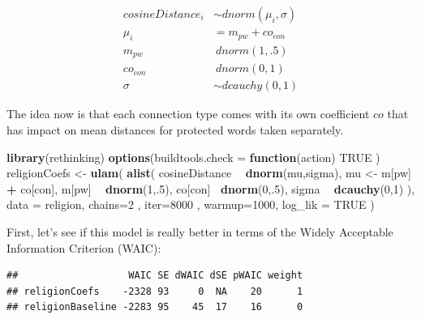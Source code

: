 \documentclass[12pt,]{book}
\newenvironment{Shaded}{\begin{snugshade}}{\end{snugshade}}
\newcommand{\KeywordTok}[1]{\textcolor[rgb]{0.13,0.29,0.53}{\textbf{#1}}}
\newcommand{\DataTypeTok}[1]{\textcolor[rgb]{0.13,0.29,0.53}{#1}}
\newcommand{\DecValTok}[1]{\textcolor[rgb]{0.00,0.00,0.81}{#1}}
\newcommand{\StringTok}[1]{\textcolor[rgb]{0.31,0.60,0.02}{#1}}
\newcommand{\OtherTok}[1]{\textcolor[rgb]{0.56,0.35,0.01}{#1}}
\newcommand{\ControlFlowTok}[1]{\textcolor[rgb]{0.13,0.29,0.53}{\textbf{#1}}}
\newcommand{\OperatorTok}[1]{\textcolor[rgb]{0.81,0.36,0.00}{\textbf{#1}}}
\newcommand{\NormalTok}[1]{#1}
\begin{document}
\begin{align}
cosineDistance_i  & \sim dnorm(\mu_i, \sigma) \\
\mu_i & = m_{pw} + co_{con}\\
m_{pw} & ~ dnorm(1,.5) \\
co_{con} & ~ dnorm(0,1) \\
\sigma &\sim  dcauchy(0,1)
\end{align}

\noindent The idea now is that each connection type comes with its own
coefficient \(co\) that has impact on mean distances for protected words
taken separately.

\vspace{1mm} \footnotesize

\begin{Shaded}
\begin{Highlighting}[]
\KeywordTok{library}\NormalTok{(rethinking)}
\KeywordTok{options}\NormalTok{(}\DataTypeTok{buildtools.check =} \ControlFlowTok{function}\NormalTok{(action) }\OtherTok{TRUE}\NormalTok{ )}
\NormalTok{religionCoefs <-}\StringTok{ }\KeywordTok{ulam}\NormalTok{(}
  \KeywordTok{alist}\NormalTok{(}
\NormalTok{    cosineDistance }\OperatorTok{~}\StringTok{ }\KeywordTok{dnorm}\NormalTok{(mu,sigma),}
\NormalTok{    mu <-}\StringTok{ }\NormalTok{m[pw] }\OperatorTok{+}\StringTok{ }\NormalTok{co[con],}
\NormalTok{    m[pw] }\OperatorTok{~}\StringTok{ }\KeywordTok{dnorm}\NormalTok{(}\DecValTok{1}\NormalTok{,.}\DecValTok{5}\NormalTok{),}
\NormalTok{    co[con] }\OperatorTok{~}\KeywordTok{dnorm}\NormalTok{(}\DecValTok{0}\NormalTok{,.}\DecValTok{5}\NormalTok{),}
\NormalTok{    sigma }\OperatorTok{~}\StringTok{ }\KeywordTok{dcauchy}\NormalTok{(}\DecValTok{0}\NormalTok{,}\DecValTok{1}\NormalTok{)}
\NormalTok{  ),}
  \DataTypeTok{data =}\NormalTok{ religion,}
  \DataTypeTok{chains=}\DecValTok{2}\NormalTok{ , }\DataTypeTok{iter=}\DecValTok{8000}\NormalTok{ , }\DataTypeTok{warmup=}\DecValTok{1000}\NormalTok{, }
  \DataTypeTok{log_lik =} \OtherTok{TRUE}
\NormalTok{)}
\end{Highlighting}
\end{Shaded}

\normalsize

\noindent First, let's see if this model is really better in terms of
the Widely Acceptable Information Criterion (WAIC):

\vspace{1mm} \footnotesize

\begin{verbatim}
##                   WAIC SE dWAIC dSE pWAIC weight
## religionCoefs    -2328 93     0  NA    20      1
## religionBaseline -2283 95    45  17    16      0
\end{verbatim}
\end{document}
